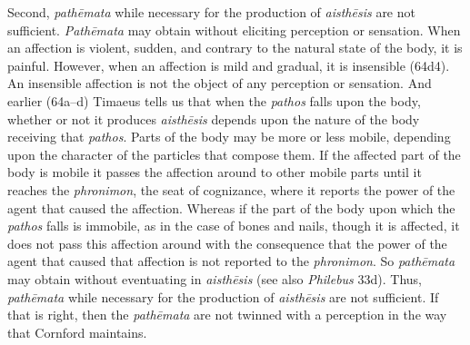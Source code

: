 Second, \emph{pathēmata} while necessary for the production of \emph{aisthēsis} are not sufficient. \emph{Pathēmata} may obtain without eliciting perception or sensation. When an affection is violent, sudden, and contrary to the natural state of the body, it is painful. However, when an affection is mild and gradual, it is insensible (64d4). An insensible affection is not the object of any perception or sensation. And earlier (64a--d) Timaeus tells us that when the \emph{pathos} falls upon the body, whether or not it produces \emph{aisthēsis} depends upon the nature of the body receiving that \emph{pathos}. Parts of the body may be more or less mobile, depending upon the character of the particles that compose them. If the affected part of the body is mobile it passes the affection around to other mobile parts until it reaches the \emph{phronimon}, the seat of cognizance, where it reports the power of the agent that caused the affection. Whereas if the part of the body upon which the \emph{pathos} falls is immobile, as in the case of bones and nails, though it is affected, it does not pass this affection around with the consequence that the power of the agent that caused that affection is not reported to the \emph{phronimon}. So \emph{pathēmata} may obtain without eventuating in \emph{aisthēsis} (see also \emph{Philebus} 33d). Thus, \emph{pathēmata} while necessary for the production of \emph{aisthēsis} are not sufficient. If that is right, then the \emph{pathēmata} are not twinned with a perception in the way that Cornford maintains.

